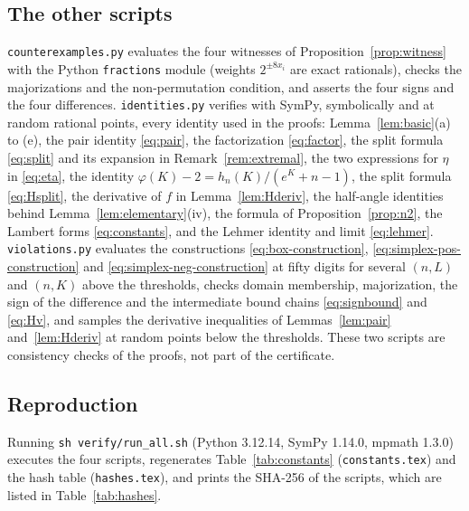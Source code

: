 \documentclass[11pt,a4paper]{article}
\theoremstyle{plain}
\theoremstyle{definition}
\begin{document}
\subsection{The other scripts}
\begin{sloppypar}
\texttt{counterexamples.py} evaluates the four witnesses of Proposition~\ref{prop:witness} with the Python \texttt{fractions} module (weights $2^{\pm 8x_i}$ are exact rationals), checks the majorizations and the non-permutation condition, and asserts the four signs and the four differences. \texttt{identities.py} verifies with SymPy, symbolically and at random rational points, every identity used in the proofs: Lemma~\ref{lem:basic}(a) to (e), the pair identity \eqref{eq:pair}, the factorization \eqref{eq:factor}, the split formula \eqref{eq:split} and its expansion in Remark~\ref{rem:extremal}, the two expressions for $\eta$ in \eqref{eq:eta}, the identity $\varphi(K)-2=h_n(K)/(e^K+n-1)$, the split formula \eqref{eq:Hsplit}, the derivative of $f$ in Lemma~\ref{lem:Hderiv}, the half-angle identities behind Lemma~\ref{lem:elementary}(iv), the formula of Proposition~\ref{prop:n2}, the Lambert forms \eqref{eq:constants}, and the Lehmer identity and limit \eqref{eq:lehmer}. \texttt{violations.py} evaluates the constructions \eqref{eq:box-construction}, \eqref{eq:simplex-pos-construction} and \eqref{eq:simplex-neg-construction} at fifty digits for several $(n,L)$ and $(n,K)$ above the thresholds, checks domain membership, majorization, the sign of the difference and the intermediate bound chains \eqref{eq:signbound} and \eqref{eq:Hv}, and samples the derivative inequalities of Lemmas~\ref{lem:pair} and~\ref{lem:Hderiv} at random points below the thresholds. These two scripts are consistency checks of the proofs, not part of the certificate.
\end{sloppypar}

\subsection{Reproduction}
Running \texttt{sh verify/run\_all.sh} (Python 3.12.14, SymPy 1.14.0, mpmath 1.3.0) executes the four scripts, regenerates Table~\ref{tab:constants} (\texttt{constants.tex}) and the hash table (\texttt{hashes.tex}), and prints the SHA-256 of the scripts, which are listed in Table~\ref{tab:hashes}.

\begin{table}[t]
\centering\small

\caption{SHA-256 of the verification scripts.}\label{tab:hashes}
\end{table}
\end{document}
